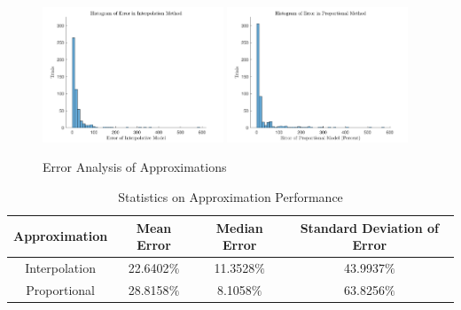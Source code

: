 \documentclass[12pt]{article}
\begin{document}
    \begin{figure}[h!]
        \centering
        \includegraphics[width=0.48\textwidth]{figures/interp_error.pdf}
        \includegraphics[width=0.48\textwidth]{figures/prop_error.pdf}
        \caption{Error Analysis of Approximations}
        \label{fig:error_hist}
    \end{figure}
    \begin{table}[b]
        \centering
        \begin{tabular}{|| c|c|c|c ||}\hline\hline
            Approximation & Mean Error & Median Error & Standard Deviation of Error\\\hline
            Interpolation & 22.6402$\%$ & 11.3528$\%$ & 43.9937$\%$\\\hline
            Proportional  & 28.8158$\%$ & 8.1058$\%$  & 63.8256$\%$ \\
            \hline\hline
        \end{tabular}
        \caption{Statistics on Approximation Performance}
        \label{tab:error_stat}
    \end{table}
\end{document}
